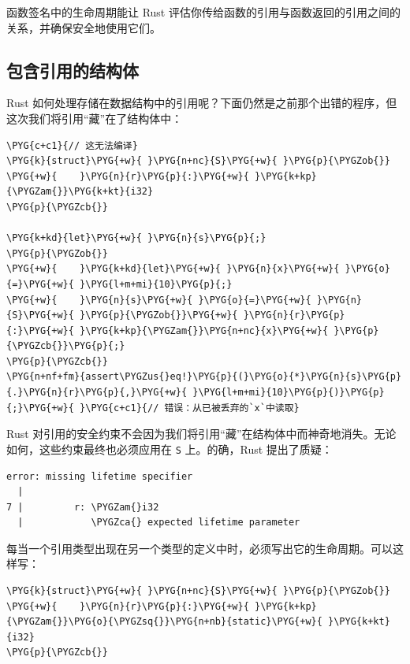 函数签名中的生命周期能让 Rust 评估你传给函数的引用与函数返回的引用之间的关系，并确保安全地使用它们。

\subsection{包含引用的结构体}

Rust 如何处理存储在数据结构中的引用呢？下面仍然是之前那个出错的程序，但这次我们将引用“藏”在了结构体中：

\begin{Verbatim}[commandchars=\\\{\},breaklines=true,breakanywhere=true,fontsize=\codefont,xleftmargin=17bp]
\PYG{c+c1}{// 这无法编译}
\PYG{k}{struct}\PYG{+w}{ }\PYG{n+nc}{S}\PYG{+w}{ }\PYG{p}{\PYGZob{}}
\PYG{+w}{    }\PYG{n}{r}\PYG{p}{:}\PYG{+w}{ }\PYG{k+kp}{\PYGZam{}}\PYG{k+kt}{i32}
\PYG{p}{\PYGZcb{}}

\PYG{k+kd}{let}\PYG{+w}{ }\PYG{n}{s}\PYG{p}{;}
\PYG{p}{\PYGZob{}}
\PYG{+w}{    }\PYG{k+kd}{let}\PYG{+w}{ }\PYG{n}{x}\PYG{+w}{ }\PYG{o}{=}\PYG{+w}{ }\PYG{l+m+mi}{10}\PYG{p}{;}
\PYG{+w}{    }\PYG{n}{s}\PYG{+w}{ }\PYG{o}{=}\PYG{+w}{ }\PYG{n}{S}\PYG{+w}{ }\PYG{p}{\PYGZob{}}\PYG{+w}{ }\PYG{n}{r}\PYG{p}{:}\PYG{+w}{ }\PYG{k+kp}{\PYGZam{}}\PYG{n+nc}{x}\PYG{+w}{ }\PYG{p}{\PYGZcb{}}\PYG{p}{;}
\PYG{p}{\PYGZcb{}}
\PYG{n+nf+fm}{assert\PYGZus{}eq!}\PYG{p}{(}\PYG{o}{*}\PYG{n}{s}\PYG{p}{.}\PYG{n}{r}\PYG{p}{,}\PYG{+w}{ }\PYG{l+m+mi}{10}\PYG{p}{)}\PYG{p}{;}\PYG{+w}{ }\PYG{c+c1}{// 错误：从已被丢弃的`x`中读取}
\end{Verbatim}

Rust 对引用的安全约束不会因为我们将引用“藏”在结构体中而神奇地消失。无论如何，这些约束最终也必须应用在 \texttt{S} 上。的确，Rust 提出了质疑：

\begin{Verbatim}[commandchars=\\\{\},breaklines=true,breakanywhere=true,fontsize=\codefont,xleftmargin=17bp]
error: missing lifetime specifier
  |
7 |         r: \PYGZam{}i32
  |            \PYGZca{} expected lifetime parameter
\end{Verbatim}

每当一个引用类型出现在另一个类型的定义中时，必须写出它的生命周期。可以这样写：

\begin{Verbatim}[commandchars=\\\{\},breaklines=true,breakanywhere=true,fontsize=\codefont,xleftmargin=17bp]
\PYG{k}{struct}\PYG{+w}{ }\PYG{n+nc}{S}\PYG{+w}{ }\PYG{p}{\PYGZob{}}
\PYG{+w}{    }\PYG{n}{r}\PYG{p}{:}\PYG{+w}{ }\PYG{k+kp}{\PYGZam{}}\PYG{o}{\PYGZsq{}}\PYG{n+nb}{static}\PYG{+w}{ }\PYG{k+kt}{i32}
\PYG{p}{\PYGZcb{}}
\end{Verbatim}

